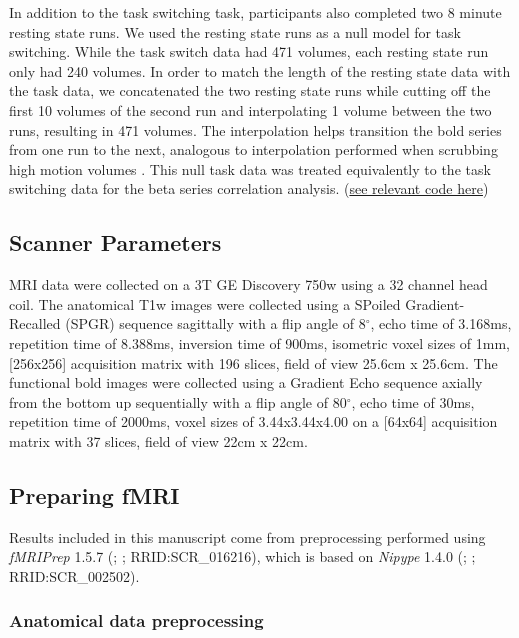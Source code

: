 \documentclass[10pt,letterpaper]{article}
\begin{document}
In addition to the task switching task, participants also completed
two 8 minute resting state runs.
We used the resting state runs as a null model for task switching.
While the task switch data had 471 volumes, each resting state run only had
240 volumes.
In order to match the length of the resting state data with the task data, we concatenated
the two resting state runs while cutting off the first 10 volumes of the second run
and interpolating 1 volume between the two runs, resulting in 471 volumes.
The interpolation helps transition the bold series from one run to the next,
analogous to interpolation performed when scrubbing high motion volumes \cite{Power2014a}. 
This null task data was treated equivalently to the task switching data for the
beta series correlation analysis.
(\href{https://github.com/jdkent/validateBetaSeries/tree/195ad5b4201971038dbbf8f73a3c537caf032743}{see relevant code here})

\subsection*{Scanner Parameters}
\label{methods:scanner}

MRI data were collected on a 3T GE Discovery 750w using a 32 channel head coil.
The anatomical T1w images were collected using a SPoiled Gradient-Recalled (SPGR) sequence
sagittally with a flip angle of 8$^{\circ}$, echo time of 3.168ms,
repetition time of 8.388ms, inversion time of 900ms, isometric voxel sizes of 1mm,
[256x256] acquisition matrix with 196 slices, field of view 25.6cm x 25.6cm.
The functional bold images were collected using a Gradient Echo sequence axially from
the bottom up sequentially with a flip angle of 80$^{\circ}$, echo time of 30ms,
repetition time of 2000ms, voxel sizes of 3.44x3.44x4.00 on a [64x64] acquisition matrix
with 37 slices, field of view 22cm x 22cm.

\subsection*{Preparing fMRI}
\label{methods:fmriprep}

Results included in this manuscript come from preprocessing performed
using \emph{fMRIPrep} 1.5.7 (\cite{fmriprep1}; \cite{fmriprep2}; RRID:SCR\_016216),
which is based on \emph{Nipype} 1.4.0
(\cite{nipype1}; \cite{nipype2}; RRID:SCR\_002502).


\subsubsection*{Anatomical data preprocessing}
\label{methods:anat}
\end{document}
